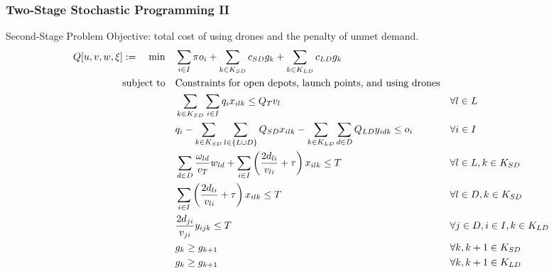 \documentclass[aspectratio=169]{beamer}
\begin{document}
\begin{frame}
    \frametitle{Two-Stage Stochastic Programming II}
    \begin{alertblock}{Second-Stage Problem}
    \small
    Objective: total cost of using drones and the penalty of unmet demand.
    \tiny
    \vspace{-5pt}
    \begin{subequations} \label{formulation:2ndStage}
        \begin{align}
            Q[u,v,w,\xi] :=  \quad \min \quad & \sum_{i \in I} \pi o_i + \sum_{k \in K_{SD}} c_{SD} g_k + \sum_{k \in K_{LD}} c_{LD} g_k & & \label{objective:2ndStageObj} \\
                         \operatorname{subject~to} \quad & \text{Constraints for open depots, launch points, and using drones} \\
                                          & \sum_{k \in K_{SD}} \sum_{i \in I} q_i x_{ilk} \leq Q_T v_l && \forall l \in L \label{constraint:TrucksCapacity} \\
                                          & q_i - \sum_{k \in K_{SD}}\sum_{l \in \{L \cup D\}} Q_{SD} x_{ilk} - \sum_{k \in K_{LD}}\sum_{d \in D} Q_{LD} y_{idk} \leq o_i && \forall i \in I \label{constraint:UnmetDemand} \\
                                          & \sum_{d \in D} \frac{\omega_{ld}}{v_T} w_{ld} + \sum_{i \in I} \left( \frac{2d_{li}}{v_{li}} + \tau \right) x_{ilk} \leq T && \forall l \in L, k \in K_{SD} \label{constraint:LPTimeLimitSD} \\
                                          & \sum_{i \in I} \left( \frac{2d_{li}}{v_{li}} + \tau \right) x_{ilk} \leq T && \forall l \in D, k \in K_{SD} \label{constraint:DepotTimeLimitSD} \\
                                          & \frac{2d_{ji}}{v_{ji}} y_{ijk} \leq T && \forall j \in D, i \in I, k \in K_{LD} \label{constraint:DepotTimeLimitLD} \\
                                          & g_k \geq g_{k+1} && \forall k, k+1 \in K_{SD} \label{constraint:SD_Remove_Symmetry} \\
                                          & g_k \geq g_{k+1} && \forall k, k+1 \in K_{LD} \label{constraint:LD_Remove_Symmetry} 
        \end{align}
    \end{subequations}
    \end{alertblock}
\end{frame}
\end{document}
